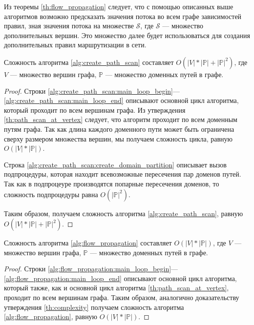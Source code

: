 \documentclass[../thesis.tex]{subfiles}
\begin{document}
Из теоремы \ref{th:flow_propagation} следует, что с помощью описанных выше алгоритмов возможно предсказать значения потока во всем графе зависимостей правил, зная значения потока на множестве $\mathscr{S}$, где $\mathscr{S}$ --- множество дополнительных вершин.
Это множество далее будет использоваться для создания дополнительных правил маршрутизации в сети.

\begin{proposition} \label{th:complexity}
Сложность алгоритма \ref{alg:create_path_scan} составляет $O(|V|*|\mathbb{P}| + |\mathbb{P}|^2)$, где $V$ --- множество вершин графа, $\mathbb{P}$ --- множество доменных путей в графе.
\end{proposition}

\begin{proof}
Строки \ref{alg:create_path_scan:main_loop_begin}---\ref{alg:create_path_scan:main_loop_end} описывают основной цикл алгоритма, который проходит по всем вершинам графа.
Из утверждения \ref{th:path_scan_at_vertex} следует, что алгоритм проходит по всем доменным путям графа.
Так как длина каждого доменного пути может быть ограничена сверху размером множества вершин, мы получаем сложность цикла, равную $O(|V|*|\mathbb{P}|)$.

Строка \ref{alg:create_path_scan:create_domain_partition} описывает вызов подпроцедуры, которая находит всевозможные пересечения пар доменов путей.
Так как в подпроцеуре производятся попарные пересечения доменов, то сложность подпроцедуры равна $O(|\mathbb{P}|^2)$.

Таким образом, получаем сложность алгоритма \ref{alg:create_path_scan}, равную\linebreak $O(|V|*|\mathbb{P}| + |\mathbb{P}|^2)$.
\end{proof}

\begin{proposition}
Сложность алгоритма \ref{alg:flow_propagation} составляет $O(|V|*|\mathbb{P}|)$, где $V$ --- множество вершин графа, $\mathbb{P}$ --- множество доменных путей в графе.
\end{proposition}

\begin{proof}
Строки \ref{alg:flow_propagation:main_loop_begin}---\ref{alg:flow_propagation:main_loop_end} описывают основной цикл алгоритма, который также, как и основной цикл алгоритма \ref{th:path_scan_at_vertex}, проходит по всем вершинам графа.
Таким образом, аналогично доказательству утверждения \ref{th:complexity} получаем сложность алгоритма \ref{alg:flow_propagation}, равную  $O(|V|*|\mathbb{P}|)$.
\end{proof}
\end{document}
